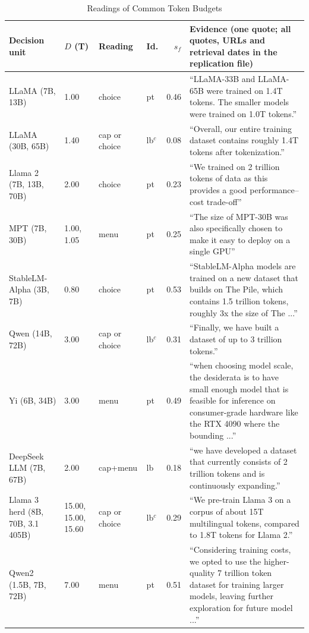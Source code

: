 \begin{table}[tp]
\centering
\caption{Readings of Common Token Budgets}
\label{tab:app-readings}
\footnotesize
\setlength{\tabcolsep}{3pt}
\begin{tabular}{@{}>{\raggedright\arraybackslash}p{2.5cm}lllr>{\raggedright\arraybackslash}p{4.8cm}@{}}
\toprule
Decision unit & $D$ (T) & Reading & Id. & $s_f$ & Evidence (one quote; all quotes, URLs and retrieval dates in the replication file) \\
\midrule
LLaMA (7B, 13B) & 1.00 & choice & pt & 0.46 & ``LLaMA-33B and LLaMA-65B were trained on 1.4T tokens. The smaller models were trained on 1.0T tokens.'' \\[2pt]
LLaMA (30B, 65B) & 1.40 & cap or choice & lb$^c$ & 0.08 & ``Overall, our entire training dataset contains roughly 1.4T tokens after tokenization.'' \\[2pt]
Llama 2 (7B, 13B, 70B) & 2.00 & choice & pt & 0.23 & ``We trained on 2 trillion tokens of data as this provides a good performance--cost trade-off'' \\[2pt]
MPT (7B, 30B) & 1.00, 1.05 & menu & pt & 0.25 & ``The size of MPT-30B was also specifically chosen to make it easy to deploy on a single GPU'' \\[2pt]
StableLM-Alpha (3B, 7B) & 0.80 & choice & pt & 0.53 & ``StableLM-Alpha models are trained on a new dataset that builds on The Pile, which contains 1.5 trillion tokens, roughly 3x the size of The ...'' \\[2pt]
Qwen (14B, 72B) & 3.00 & cap or choice & lb$^c$ & 0.31 & ``Finally, we have built a dataset of up to 3 trillion tokens.'' \\[2pt]
Yi (6B, 34B) & 3.00 & menu & pt & 0.49 & ``when choosing model scale, the desiderata is to have small enough model that is feasible for inference on consumer-grade hardware like the RTX 4090 where the bounding ...'' \\[2pt]
DeepSeek LLM (7B, 67B) & 2.00 & cap+menu & lb & 0.18 & ``we have developed a dataset that currently consists of 2 trillion tokens and is continuously expanding.'' \\[2pt]
Llama 3 herd (8B, 70B, 3.1 405B) & 15.00, 15.00, 15.60 & cap or choice & lb$^c$ & 0.29 & ``We pre-train Llama 3 on a corpus of about 15T multilingual tokens, compared to 1.8T tokens for Llama 2.'' \\[2pt]
Qwen2 (1.5B, 7B, 72B) & 7.00 & menu & pt & 0.51 & ``Considering training costs, we opted to use the higher-quality 7 trillion token dataset for training larger models, leaving further exploration for future model ...'' \\[2pt]

\end{tabular}
\end{table}
